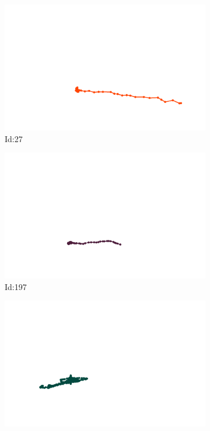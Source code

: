 \documentclass[12pt,twoside]{report}
\begin{document}
\begin{figure}
\centering
\begin{subfigure}[b]{0.20\textwidth}
\centering
\includegraphics[width=\textwidth]{../../trajectories/27.png}
\caption{Id:27}
\end{subfigure}
\begin{subfigure}[b]{0.20\textwidth}
\centering
\includegraphics[width=\textwidth]{../../trajectories/197.png}
\caption{Id:197}
\end{subfigure}
\begin{subfigure}[b]{0.20\textwidth}
\centering
\includegraphics[width=\textwidth]{../../trajectories/262.png}

\end{subfigure}
\end{figure}
\end{document}
